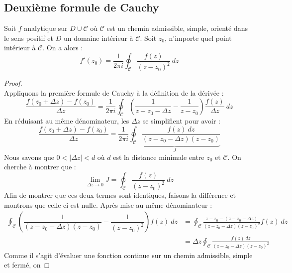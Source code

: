     
\subsection{Deuxième formule de Cauchy}
Soit $f$ analytique sur $D \cup \mathcal{C}$ où $\mathcal{C}$ est un chemin admissible, simple,
orienté dans le sens positif et $D$ un domaine intérieur à $\mathcal{C}$. Soit $z_0$, n'importe
quel point intérieur à $\mathcal{C}$. On a alors : 
\begin{equation}
	f'(z_0) = \dfrac{1}{2\pi i}\oint_\mathcal{C}\dfrac{f(z)}{(z-z_0)^2}\ dz
\end{equation}
    
\begin{proof}
	\ \\
	Appliquons la première formule de Cauchy à la définition de la dérivée :
	\begin{equation}
		\dfrac{f(z_0 +  \Delta z) - f(z_0)}{\Delta z} = \frac{1}{2\pi i}\oint_\mathcal{C}\left(
		\dfrac{1}{z-z_0 - \Delta z} - \dfrac{1}{z-z_0}\right)\dfrac{f(z)}{\Delta z}\ dz
	\end{equation}
	En réduisant au même dénominateur, les $\Delta z$ se simplifient pour avoir :
	\begin{equation}
		\dfrac{f(z_0 +  \Delta z) - f(z_0)}{\Delta z} = \frac{1}{2\pi i}\underbrace{\oint_\mathcal{C}
			\dfrac{f(z)\ dz}{(z-z_0-\Delta z)(z-z_0)}}_{J}
	\end{equation}
	Nous savons que $0<|\Delta z| < d$ où $d$ est la distance minimale entre $z_0$ et $\mathcal{C}$.
	On cherche à montrer que :
	\begin{equation}
		\lim\limits_{\Delta z \rightarrow 0} J = \oint_\mathcal{C}\frac{f(z)}{(z-z_0)^2}\ dz
	\end{equation}
	Afin de montrer que ces deux termes sont identiques, faisons la différence et montrons que 
	celle-ci est nulle. Après mise au même dénominateur :
	\begin{equation}
		\begin{array}{ll}
			\oint_\mathcal{C}\left(\dfrac{1}{(z-z_0-\Delta z)(z-z_0)} - 
			\dfrac{1}{(z-z_0)^2}\right)f(z)\ dz & = \oint_\mathcal{C} \frac{z-z_0 - (z-z_0-\Delta z)}{(z-                
			z_0-\Delta z)(z-z_0)^2}f(z)\ dz\\
			                                    & = \Delta z\oint_\mathcal{C} \frac{f(z)\ dz}{(z-z_0-\Delta z)(z-z_0)^2} 
		\end{array}
	\end{equation}
	Comme il s'agit d'évaluer une fonction continue sur un chemin admissible, simple et fermé, on

\end{proof}
